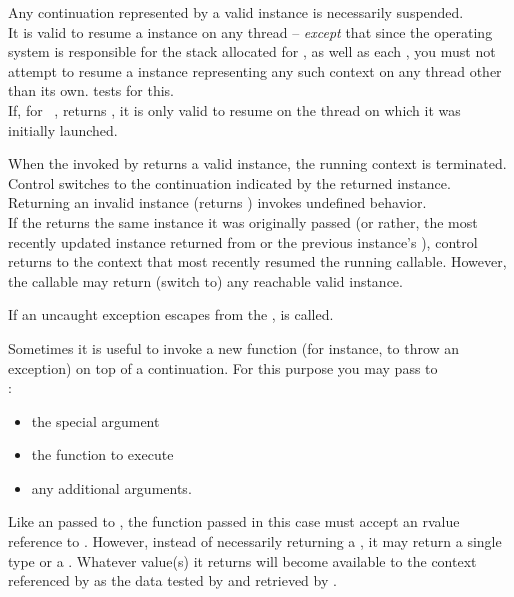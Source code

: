 Any continuation represented by a valid \cont instance is necessarily suspended.\\
It is valid to resume a \cont instance on any thread -- \emph{except} that
since the operating system is responsible for the stack allocated for \main,
as well as each , you must not attempt to resume a \cont
instance representing any such context on any thread other
than its own.  tests for this.\\
If, for \cont\ ,  returns , it is
only valid to resume  on the thread on which it was initially
launched.


When the \entryfn invoked by \cc returns a valid \cont instance,
the running context is terminated. Control switches to the continuation
indicated by the returned \cont instance.\\
Returning an invalid \cont instance (\opbool returns ) invokes
undefined behavior.\\
If the \entryfn returns the same \cont instance it was originally
passed (or rather, the most recently updated instance returned from \callcc or the
previous instance's \resume), control returns to the context that most
recently resumed the running callable. However, the callable may return (switch
to) any reachable valid \cont instance.


\label{subsec:exceptions}
If an uncaught exception escapes from the \entryfn,  is
called.


Sometimes it is useful to invoke a new function (for instance, to throw an
exception) on top of a continuation. For this purpose you may pass to\\
:

\begin{itemize}
  \item the special argument 
  \item the function to execute
  \item any additional arguments.
\end{itemize}

Like an \entryfn passed to \callcc, the function passed in this case must
accept an rvalue reference to \cont. However, instead of necessarily returning
a \cont, it may return a single type or a . Whatever value(s)
it returns will become available to the context referenced by  as
the data tested by \dataavail and retrieved by \getdata.\\

